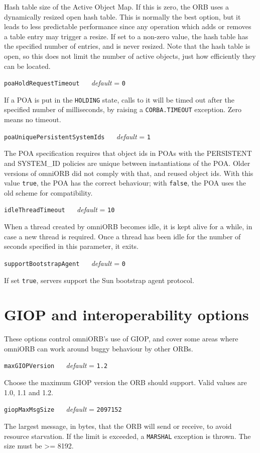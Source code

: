 \documentclass[11pt,oneside,a4paper]{book}
\makeatletter
\newcommand{\code}[1]{\texttt{#1}}
\newcommand{\confopt}[2]
  {\vspace{\baselineskip}\par\noindent\code{#1} ~~ \textit{default} =
   \code{#2}}
\renewcommand{\confopt}[2]
  {\vspace{\baselineskip}\par\noindent\code{#1} ~~ \textit{default} =
   \code{#2}\\[-1ex]\@afterheading}
\makeatother
\begin{document}
Hash table size of the Active Object Map. If this is zero, the ORB
uses a dynamically resized open hash table. This is normally the best
option, but it leads to less predictable performance since any
operation which adds or removes a table entry may trigger a resize. If
set to a non-zero value, the hash table has the specified number of
entries, and is never resized. Note that the hash table is open, so
this does not limit the number of active objects, just how efficiently
they can be located.


\confopt{poaHoldRequestTimeout}{0}

If a POA is put in the \code{HOLDING} state, calls to it will be timed
out after the specified number of milliseconds, by raising a
\code{CORBA.TIMEOUT} exception. Zero means no timeout.

\confopt{poaUniquePersistentSystemIds}{1}

The POA specification requires that object ids in POAs with the
PERSISTENT and SYSTEM\_ID policies are unique between instantiations
of the POA. Older versions of omniORB did not comply with that, and
reused object ids. With this value \code{true}, the POA has the
correct behaviour; with \code{false}, the POA uses the old scheme for
compatibility.

\confopt{idleThreadTimeout}{10}

When a thread created by omniORB becomes idle, it is kept alive for a
while, in case a new thread is required. Once a thread has been idle
for the number of seconds specified in this parameter, it exits.

\confopt{supportBootstrapAgent}{0}

If set \code{true}, servers support the Sun bootstrap agent protocol.



\section{GIOP and interoperability options}

These options control omniORB's use of GIOP, and cover some areas
where omniORB can work around buggy behaviour by other ORBs.


\confopt{maxGIOPVersion}{1.2}

Choose the maximum GIOP version the ORB should support. Valid values
are 1.0, 1.1 and 1.2.


\confopt{giopMaxMsgSize}{2097152}

The largest message, in bytes, that the ORB will send or receive, to
avoid resource starvation. If the limit is exceeded, a \code{MARSHAL}
exception is thrown. The size must be >= 8192.
\end{document}
